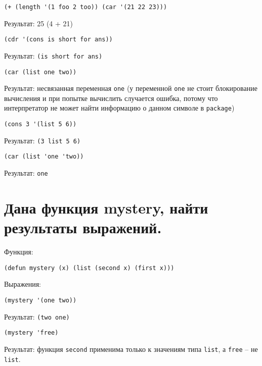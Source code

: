 \begin{lstlisting}
(+ (length '(1 foo 2 too)) (car '(21 22 23)))
\end{lstlisting}
Результат: 25 (4 + 21)
\vspace{20mm}

\begin{lstlisting}
(cdr '(cons is short for ans))
\end{lstlisting}
Результат: \texttt{(is short for ans)}
\vspace{20mm}

\begin{lstlisting}
(car (list one two))
\end{lstlisting}
Результат: несвязанная переменная \texttt{one} (у переменной \texttt{one} не стоит блокирование вычисления и при попытке вычислить случается ошибка, потому что интерпретатор не может найти информацию о данном символе в \texttt{package})
\vspace{20mm}

\begin{lstlisting}
(cons 3 '(list 5 6))
\end{lstlisting}
Результат: \texttt{(3 list 5 6)}
\vspace{20mm}


\begin{lstlisting}
(car (list 'one 'two))
\end{lstlisting}
Результат: \texttt{one}
\vspace{20mm}

\section{Дана функция mystery, найти результаты выражений.}

Функция:
\begin{lstlisting}
(defun mystery (x) (list (second x) (first x)))
\end{lstlisting}

Выражения:

\begin{lstlisting}
(mystery '(one two))
\end{lstlisting}
Результат: \texttt{(two one)}
\vspace{20mm}

\begin{lstlisting}
(mystery 'free)
\end{lstlisting}
Результат: функция \texttt{second} применима только к значениям типа \texttt{list}, а \texttt{free} -- не \texttt{list}.
\vspace{20mm}

